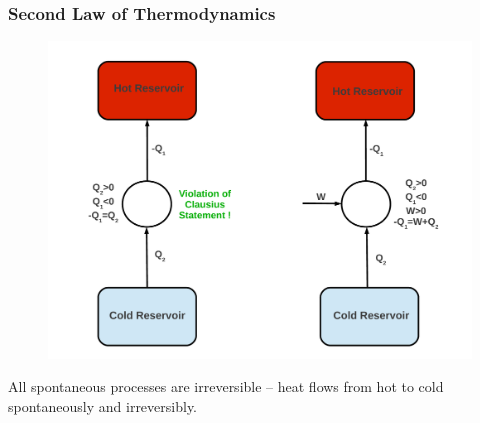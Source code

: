 \documentclass[10pt,compress,handout,ignorenonframetext]{beamer}
\begin{document}
\begin{frame}
 \frametitle{Second Law of Thermodynamics}
 
   \begin{figure}%
    \begin{center}
     \includegraphics[width=8.cm,clip]{./Pics/2ndLaw_Schem}
    \end{center}
   \end{figure} 

All spontaneous processes are irreversible -- heat flows from hot to cold spontaneously and irreversibly.
   
\end{frame}
\end{document}

